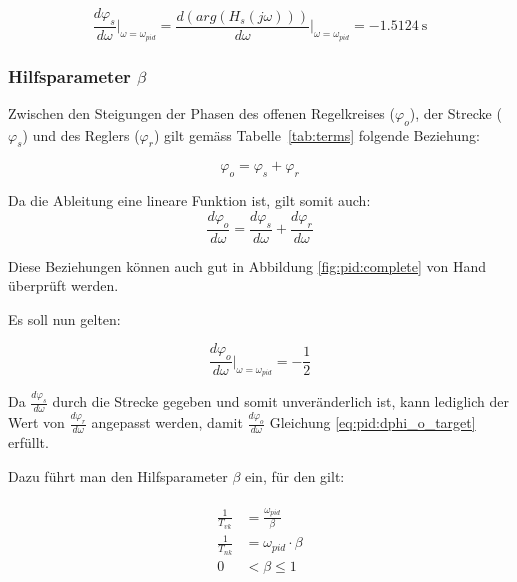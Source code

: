 \begin{equation} \label{eq:transfer:plant:derivative}
    \frac{d\varphi_s}{d\omega} \biggr \rvert_{\omega=\omega_{pid}}
        = \frac{d(arg(H_s(j\omega)))}{d\omega} \biggr \rvert_{\omega=\omega_{pid}}
        = \SI{-1.5124}{\second}
\end{equation}


\subsubsection{Hilfsparameter $\beta$}

Zwischen  den Steigungen  der Phasen  des offenen  Regelkreises ($\varphi_o$),
der  Strecke  ($\varphi_s$)  und   des  Reglers  ($\varphi_r$)  gilt  gem\"ass
Tabelle~\ref{tab:terms} folgende Beziehung:

\begin{equation} \label{eq:pid:phi_sum}
    \varphi_o = \varphi_s + \varphi_r
\end{equation}

Da die Ableitung eine lineare Funktion ist, gilt somit auch:
\begin{equation} \label{eq:pid:dphi_sum}
    \frac{d\varphi_o}{d\omega} = \frac{d\varphi_s}{d\omega} + \frac{d\varphi_r}{d\omega}
\end{equation}

Diese Beziehungen  k\"onnen auch  gut in Abbildung  \ref{fig:pid:complete} von
Hand \"uberpr\"uft werden.

Es soll nun gelten:

\begin{equation} \label{eq:pid:dphi_o_target}
    \frac{d\varphi_o}{d\omega} \biggr \rvert_{\omega=\omega_{pid}} = - \frac{1}{2}
\end{equation}

Da   $\frac{d\varphi_s}{d\omega}$  durch   die  Strecke   gegeben  und   somit
unver\"anderlich ist, kann lediglich der Wert von $\frac{d\varphi_r}{d\omega}$
angepasst     werden,     damit     $\frac{d\varphi_o}{d\omega}$     Gleichung
\ref{eq:pid:dphi_o_target} erf\"ullt.

Dazu f\"uhrt man den Hilfsparameter $\beta$ ein, f\"ur den gilt:

\begin{gather} \label{eq:pid:beta:start}
    \begin{split}
        \frac{1}{T_{vk}} & = \frac{\omega_{pid}}{\beta} \\
        \frac{1}{T_{nk}} & = \omega_{pid} \cdot \beta  \\
                       0 & <  \beta \leq 1
    \end{split}
\end{gather}

